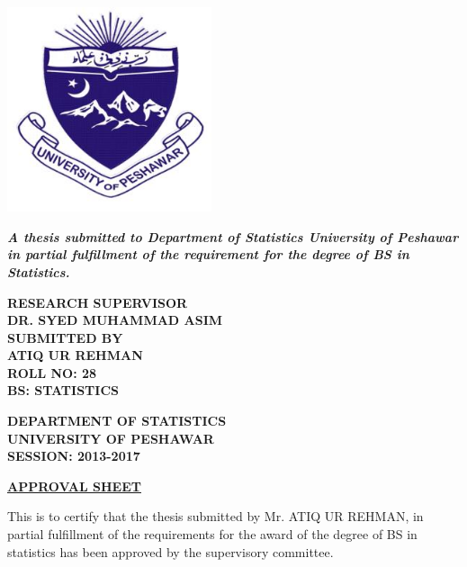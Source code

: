 \documentclass[12pt, a4paper, oneside]{Thesis} %
\begin{document}
\begin{titlepage}
\begin{center}

\newpage
{\huge \bfseries \ttitle}\\[2cm]
\includegraphics[width=6cm]{Logo}\\ \hfill \break
\begin{singlespace*}
\bf{\textit{A thesis submitted to Department of Statistics University of Peshawar in partial fulfillment of the requirement for the degree of BS in Statistics.}}\\[2cm]%
\end{singlespace*}
\begin{singlespace*}
\onehalfspacing
\normalsize{\bf{RESEARCH SUPERVISOR \\ DR. SYED MUHAMMAD ASIM}}\\ \hfill \break 
\normalsize{\bf{SUBMITTED BY \\ ATIQ UR REHMAN}}\\
\normalsize{\bf{ROLL NO: 28\\ BS: STATISTICS}}\\[3cm]
\end{singlespace*}
 \begin{singlespace*}
\onehalfspacing
\large{\bf{DEPARTMENT OF STATISTICS\\ UNIVERSITY OF PESHAWAR \\ SESSION: 2013-2017}}
\end{singlespace*}

\newpage
\begin{center}
\underline{\textbf{\large{APPROVAL SHEET}}}\\[1cm]
\end{center}

\begin{singlespace*}
\normalsize{This is to certify that the thesis submitted by Mr. ATIQ UR REHMAN, in partial fulfillment of the requirements for the award of the degree of BS in statistics has been approved by the supervisory committee.} \\[4cm]
\end{singlespace*}



\end{center}
\end{titlepage}
\end{document}
